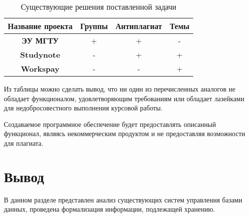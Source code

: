 \begin{table}[ht!]
	\centering
	\caption{Существующие решения поставленной задачи}
	\label{tbl:anal}
	\begin{tabular}{|c|c|c|c|}
		\hline
		\textbf{Название проекта} & \textbf{Группы} & \textbf{Антиплагиат} & \textbf{Темы}\\
		\hline
		
		\textbf{ЭУ МГТУ}\cite{eu} & + 
		& +
		& -\\
		\hline
		
		\textbf{Studynote} \cite{studynote} & - 
		& +
		& +\\
		\hline
		
		\textbf{Workspay \cite{workspay}} & -
		& -
		& +\\
		\hline
	\end{tabular}
\end{table}

Из таблицы можно сделать вывод, что ни один из перечисленных аналогов не обладает функционалом, удовлетворяющим требованиям или обладает лазейками для недобросовестного выполнения курсовой работы.

Создаваемое программное обеспечение будет предоставлять описанный функционал, являясь некоммерческим продуктом и не предоставляя возможности для плагиата.

\section{Вывод}
В данном разделе представлен анализ существующих систем управления базами данных, проведена формализация информации, подлежащей хранению.
